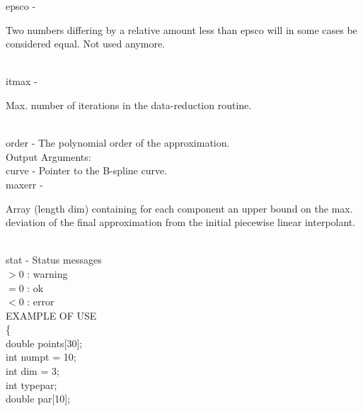         \>\>    {\fov epsco}    \> - \> \begin{minipg2}
                                Two numbers differing by a relative amount less
                                than epsco will in some cases be
                                considered equal.
                                Not used anymore.
                                \end{minipg2}\\[0.3ex]
        \>\>    {\fov itmax}    \> - \> \begin{minipg2}
                                Max. number of iterations in the data-reduction routine.
                                \end{minipg2}\\
        \>\>    {\fov order}    \> - \> The polynomial order of the approximation.\\
        \>Output Arguments:\\
        \>\>    {\fov curve}    \> - \> Pointer to the B-spline curve.\\
        \>\>    {\fov maxerr}   \> - \> \begin{minipg2}
                                Array (length dim)
                                containing for each component an upper
                                bound on the max. deviation of the final
                                approximation from the initial piecewise linear
                                interpolant.
                                \end{minipg2}\\[0.3ex]
        \>\>    {\fov stat}     \> - \> Status messages\\
                \>\>\>\>\>              $> 0$   : warning\\
                \>\>\>\>\>              $= 0$   : ok\\
                \>\>\>\>\>              $< 0$   : error\\
\newpagetabs
EXAMPLE OF USE\\
                \>      \{ \\
                \>\>    double  \>      {\fov points}[30];\\
                \>\>    int     \>      {\fov numpt} = 10;\\
                \>\>    int     \>      {\fov dim} = 3;\\
                \>\>    int     \>      {\fov typepar};\\
                \>\>    double  \>      {\fov par}[10];\\
